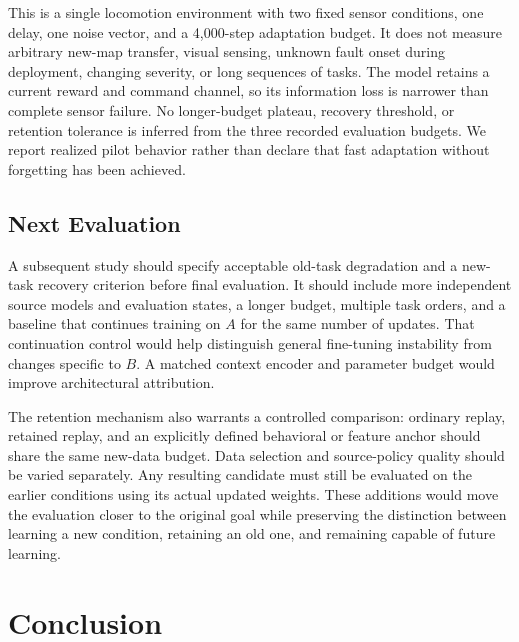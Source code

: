 \documentclass[runningheads]{llncs}
\begin{document}
This is a single locomotion environment with two fixed sensor conditions, one delay, one noise vector, and a 4,000-step adaptation budget. It does not measure arbitrary new-map transfer, visual sensing, unknown fault onset during deployment, changing severity, or long sequences of tasks. The model retains a current reward and command channel, so its information loss is narrower than complete sensor failure. No longer-budget plateau, recovery threshold, or retention tolerance is inferred from the three recorded evaluation budgets. We report realized pilot behavior rather than declare that fast adaptation without forgetting has been achieved.

\subsection{Next Evaluation}
A subsequent study should specify acceptable old-task degradation and a new-task recovery criterion before final evaluation. It should include more independent source models and evaluation states, a longer budget, multiple task orders, and a baseline that continues training on $A$ for the same number of updates. That continuation control would help distinguish general fine-tuning instability from changes specific to $B$. A matched context encoder and parameter budget would improve architectural attribution.

The retention mechanism also warrants a controlled comparison: ordinary replay, retained replay, and an explicitly defined behavioral or feature anchor should share the same new-data budget. Data selection and source-policy quality should be varied separately. Any resulting candidate must still be evaluated on the earlier conditions using its actual updated weights. These additions would move the evaluation closer to the original goal while preserving the distinction between learning a new condition, retaining an old one, and remaining capable of future learning.

\section{Conclusion}

\end{document}
